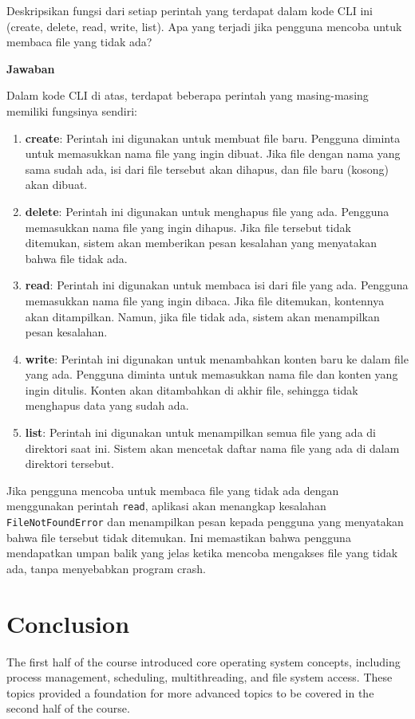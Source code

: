 \documentclass[12pt]{article}
\begin{document}
Deskripsikan fungsi dari setiap perintah yang terdapat dalam kode CLI ini (create, delete, read, write, list). Apa yang terjadi jika pengguna mencoba untuk membaca file yang tidak ada?

\textbf{Jawaban}

Dalam kode CLI di atas, terdapat beberapa perintah yang masing-masing memiliki fungsinya sendiri:

\begin{enumerate}
    \item \textbf{create}: Perintah ini digunakan untuk membuat file baru. Pengguna diminta untuk memasukkan nama file yang ingin dibuat. Jika file dengan nama yang sama sudah ada, isi dari file tersebut akan dihapus, dan file baru (kosong) akan dibuat.
    
    \item \textbf{delete}: Perintah ini digunakan untuk menghapus file yang ada. Pengguna memasukkan nama file yang ingin dihapus. Jika file tersebut tidak ditemukan, sistem akan memberikan pesan kesalahan yang menyatakan bahwa file tidak ada.
    
    \item \textbf{read}: Perintah ini digunakan untuk membaca isi dari file yang ada. Pengguna memasukkan nama file yang ingin dibaca. Jika file ditemukan, kontennya akan ditampilkan. Namun, jika file tidak ada, sistem akan menampilkan pesan kesalahan.
    
    \item \textbf{write}: Perintah ini digunakan untuk menambahkan konten baru ke dalam file yang ada. Pengguna diminta untuk memasukkan nama file dan konten yang ingin ditulis. Konten akan ditambahkan di akhir file, sehingga tidak menghapus data yang sudah ada.
    
    \item \textbf{list}: Perintah ini digunakan untuk menampilkan semua file yang ada di direktori saat ini. Sistem akan mencetak daftar nama file yang ada di dalam direktori tersebut.
\end{enumerate}

Jika pengguna mencoba untuk membaca file yang tidak ada dengan menggunakan perintah \texttt{read}, aplikasi akan menangkap kesalahan \texttt{FileNotFoundError} dan menampilkan pesan kepada pengguna yang menyatakan bahwa file tersebut tidak ditemukan. Ini memastikan bahwa pengguna mendapatkan umpan balik yang jelas ketika mencoba mengakses file yang tidak ada, tanpa menyebabkan program crash.

\section{Conclusion}
The first half of the course introduced core operating system concepts, including process management, scheduling, multithreading, and file system access. These topics provided a foundation for more advanced topics to be covered in the second half of the course.
\end{document}
